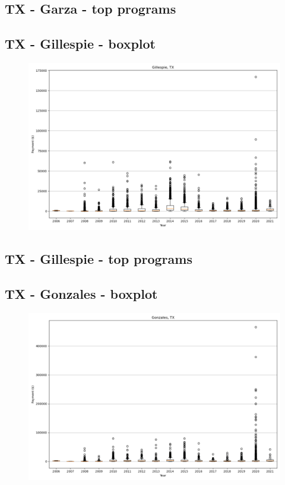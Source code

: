 \subsection*{TX - Garza - top programs}

\newpage
\subsection*{TX - Gillespie - boxplot}
\begin{figure}[h]
\centering
\includegraphics[width=7in]{../output/boxplots/counties/Gillespie-TX_boxplot.png}
\end{figure}


\subsection*{TX - Gillespie - top programs}

\newpage
\subsection*{TX - Gonzales - boxplot}
\begin{figure}[h]
\centering
\includegraphics[width=7in]{../output/boxplots/counties/Gonzales-TX_boxplot.png}
\end{figure}


